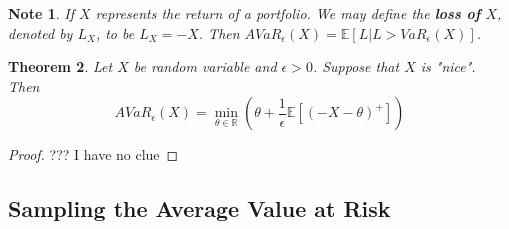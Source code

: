 \documentclass[12pt]{amsart}
\newtheorem{thm}{Theorem}[section]
\newtheorem{note}[thm]{Note}
\newcommand{\ep}{\epsilon}
\newcommand{\E}{\mathbb{E}}
\newcommand{\R}{\mathbb{R}}
\begin{document}
\begin{note}
If $X$ represents the return of a portfolio. We may define the \textbf{loss of} $X$, denoted by $L_X$, to be $L_X = -X$. Then $AVaR_{\ep}(X) = \E[L|L>VaR_{\ep}(X)]$.  
\end{note}

\begin{thm}
Let $X$ be random variable and $\ep>0$. Suppose that $X$ is "nice". Then $$AVaR_{\ep}(X) = \min_{\theta \in \R} (\theta + \frac{1}{\ep}\E[(-X - \theta)^+])$$
\end{thm}

\begin{proof}
??? I have no clue
\end{proof}

\subsection{Sampling the Average Value at Risk}
\end{document}
